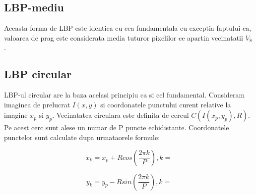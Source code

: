\subsection{LBP-mediu}

\quad Aceasta forma de LBP este identica cu cea fundamentala cu exceptia
faptului ca, valoarea de prag este considerata media tuturor pixelilor
ce apartin vecinatatii $V_8$.


\subsection{LBP circular}

\quad LBP-ul circular are la baza acelasi principiu ca si cel
fundamental. Consideram imaginea de prelucrat $I(x,y)$ si coordonatele
punctului curent relative la imagine $x_p$ si $y_p$. Vecinatatea 
circulara este definita de cercul $C(I(x_p,y_p), R)$. Pe acest 
cerc sunt alese un numar de P puncte echidistante. Coordonatele 
punctelor sunt calculate dupa urmataorele formule:
	
\begin{equation}
	x_k = x_p + Rcos(\frac{2 \pi k}{P}), k = 
\end{equation}

\begin{equation}
	y_k = y_p - Rsin(\frac{2 \pi k}{P}), k = 
\end{equation}

